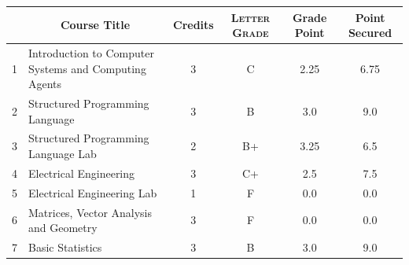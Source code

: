\documentclass[11pt]{article}
\newcommand*{\numtwo}[1]{\pgfmathprintnumber[
                    fixed, precision=2, fixed zerofill=true]{#1}}
\begin{document}
                \begin{center}
                    \renewcommand{\arraystretch}{1.08}
                    
                \begin{tabular}{|c|l|c|>{\scshape}c|c|c|}
                \hline  \rule[-1ex]{0pt}{3.5ex} {\centering{\bf Course Code}} &  \multicolumn{1}{c|}{\textbf{Course Title}}  & {\bf Credits} & {\bf Letter Grade} & {\bf Grade Point} & {\bf Point Secured}  \\ 
                \hline   1 &  Introduction to Computer Systems and Computing Agents		 & 3 & C & 2.25 & 6.75 \\ %
                \hline   2 &  Structured Programming Language		 & 3 & B & 3.0 & 9.0 \\ %
                \hline   3 &  Structured Programming Language Lab		 & 2 & B+ & 3.25 & 6.5 \\ %
                \hline   4 &  Electrical Engineering		 & 3 & C+ & 2.5 & 7.5 \\ %
                \hline   5 &  Electrical Engineering Lab		 & 1 & F & 0.0 & 0.0 \\ %
                \hline   6 &  Matrices, Vector Analysis and Geometry		 & 3 & F & 0.0 & 0.0 \\ %
                \hline   7 &  Basic Statistics		 & 3 & B & 3.0 & 9.0 \\ %

\hline                %
                \end{tabular}
                \end{center}
                \renewcommand{\arraystretch}{1.03}
\end{document}
